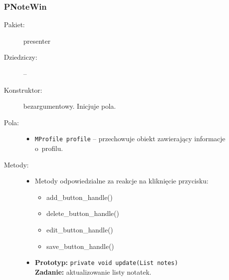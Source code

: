 \documentclass[a4paper]{article}
\newcommand{\prog}{\texttt}
\begin{document}
\subsubsection{PNoteWin}
\begin{description}
    \item[Pakiet:] presenter
    \item[Dziedziczy:] --
    \item[Konstruktor:] bezargumentowy. Inicjuje pola.
    \item[Pola:] \hfill
    \begin{itemize}
        \item \prog{MProfile profile} -- przechowuje obiekt zawierający informacje o~profilu.
    \end{itemize}
    \item[Metody:] \hfill
    \begin{itemize}
        \item Metody odpowiedzialne za reakcje na kliknięcie przycisku:
        \begin{itemize}
            \item add\_button\_handle()
            \item delete\_button\_handle()
            \item edit\_button\_handle()
            \item save\_button\_handle()
        \end{itemize}
        \item \textbf{Prototyp:} \prog{private void update(List notes)}\\\textbf{Zadanie:} aktualizowanie listy notatek.
    \end{itemize}
\end{description}
\end{document}
